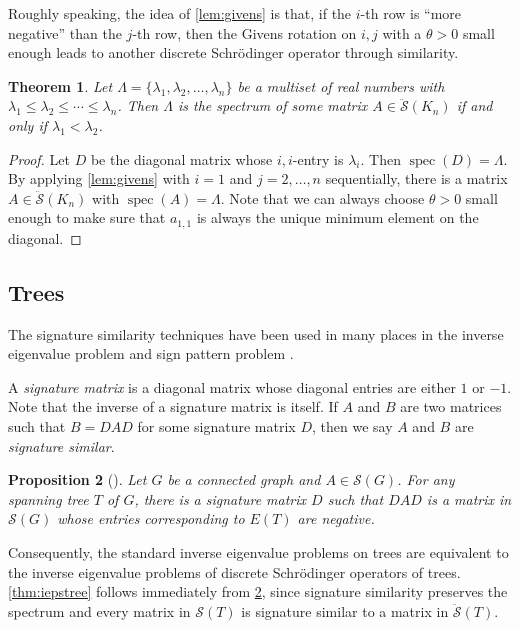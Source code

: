 \documentclass{article}
\newtheorem{theorem}{Theorem}[section]
\newtheorem{proposition}[theorem]{Proposition}
\theoremstyle{definition}
\newcommand{\spec}{\operatorname{spec}}
\newcommand{\mptn}{\mathcal{S}}
\newcommand{\mdso}{\ddot{\mathcal{S}}}
\begin{document}
Roughly speaking, the idea of \cref{lem:givens} is that, if the $i$-th row is ``more negative'' than the $j$-th row, then the Givens rotation on $i,j$ with a $\theta > 0$ small enough leads to another discrete Schrödinger operator through similarity.  

\begin{theorem}
\label{thm:kn}
Let $\Lambda = \{\lambda_1, \lambda_2, \ldots, \lambda_n\}$ be a multiset of real numbers with $\lambda_1 \leq \lambda_2 \leq \cdots \leq \lambda_n$.  Then $\Lambda$ is the spectrum of some matrix $A\in\mdso(K_n)$ if and only if $\lambda_1 < \lambda_2$.
\end{theorem}
\begin{proof}
Let $D$ be the diagonal matrix whose $i,i$-entry is $\lambda_i$.  Then $\spec(D) = \Lambda$.  By applying \cref{lem:givens} with $i = 1$ and $j = 2, \ldots, n$ sequentially, there is a matrix $A\in\mdso(K_n)$ with $\spec(A) = \Lambda$.  Note that we can always choose $\theta > 0$ small enough to make sure that $a_{1,1}$ is always the unique minimum element on the diagonal. 
\end{proof}

\subsection{Trees}

The signature similarity techniques have been used in many places in the inverse eigenvalue problem \cite{loopEGR, IEPG2} and sign pattern problem \cite{DHHHW06}.  

A \emph{signature matrix} is a diagonal matrix whose diagonal entries are either $1$ or $-1$.  Note that the inverse of a signature matrix is itself.  If $A$ and $B$ are two matrices such that $B = DAD$ for some signature matrix $D$, then we say $A$ and $B$ are \emph{signature similar}.

\begin{proposition}[\cite{DHHHW06}]
\label{prop:sigsim}
Let $G$ be a connected graph and $A\in\mptn(G)$.  For any spanning tree $T$ of $G$, there is a signature matrix $D$ such that $DAD$ is a matrix in $\mptn(G)$ whose entries corresponding to $E(T)$ are negative.
\end{proposition}

Consequently, the standard inverse eigenvalue problems on trees are equivalent to the inverse eigenvalue problems of discrete Schrödinger operators of trees.
\cref{thm:iepstree} follows immediately from \cref{prop:sigsim}, since signature similarity preserves the spectrum and every matrix in $\mptn(T)$ is signature similar to a matrix in $\mdso(T)$.
\end{document}
